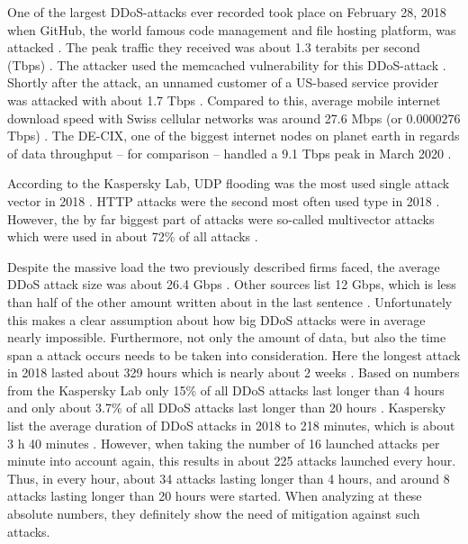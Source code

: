 One of the largest DDoS-attacks ever recorded took place on February 28, 2018 when GitHub, the world famous code management and file hosting platform, was attacked \cite{Metacompliance-DDoSStatistics}. The peak traffic they received was about 1.3 terabits per second (Tbps) \cite{Metacompliance-DDoSStatistics}. The attacker used the memcached vulnerability for this DDoS-attack \cite{Metacompliance-DDoSStatistics}. Shortly after the attack, an unnamed customer of a US-based service provider was attacked with about 1.7 Tbps \cite{Hostingtribunal-DDoSStatistics, Arstechnica-DDoSStatistics}. Compared to this, average mobile internet download speed with Swiss cellular networks was around 27.6 Mbps (or 0.0000276 Tbps) \cite{Statista-MobileInternetSpeed}. The DE-CIX, one of the biggest internet nodes on planet earth in regards of data throughput -- for comparison -- handled a 9.1 Tbps peak in March 2020 \cite{Computerbase-Datarate}.

According to the Kaspersky Lab, UDP flooding was the most used single attack vector in 2018 \cite{Securelist-DDoSStatistics}. HTTP attacks were the second most often used type in 2018 \cite{Securelist-DDoSStatistics}. However, the by far biggest part of attacks were so-called multivector attacks which were used in about 72\% of all attacks \cite{Securelist-DDoSStatistics}. 

Despite the massive load the two previously described firms faced, the average DDoS attack size was about 26.4 Gbps \cite{Hostingtribunal-DDoSStatistics}. Other sources list 12 Gbps, which is less than half of the other amount written about in the last sentence \cite{Helpnetsecurity-DDoSStatistics}. Unfortunately this makes a clear assumption about how big DDoS attacks were in average nearly impossible. Furthermore, not only the amount of data, but also the time span a attack occurs needs to be taken into consideration. Here the longest attack in 2018 lasted about 329 hours which is nearly about 2 weeks \cite{Hostingtribunal-DDoSStatistics, Securelist-DDoSStatistics}. Based on numbers from the Kaspersky Lab only 15\% of all DDoS attacks last longer than 4 hours and only about 3.7\% of all DDoS attacks last longer than 20 hours \cite{Securelist-DDoSStatistics}. Kaspersky list the average duration of DDoS attacks in 2018 to 218 minutes, which is about 3 h 40 minutes \cite{Hostingtribunal-DDoSStatistics, Securelist-DDoSStatistics}. However, when taking the number of 16 launched attacks per minute into account again, this results in about 225 attacks launched every hour. Thus, in every hour, about 34 attacks lasting longer than 4 hours, and around 8 attacks lasting longer than 20 hours were started. When analyzing at these absolute numbers, they definitely show the need of mitigation against such attacks. 

